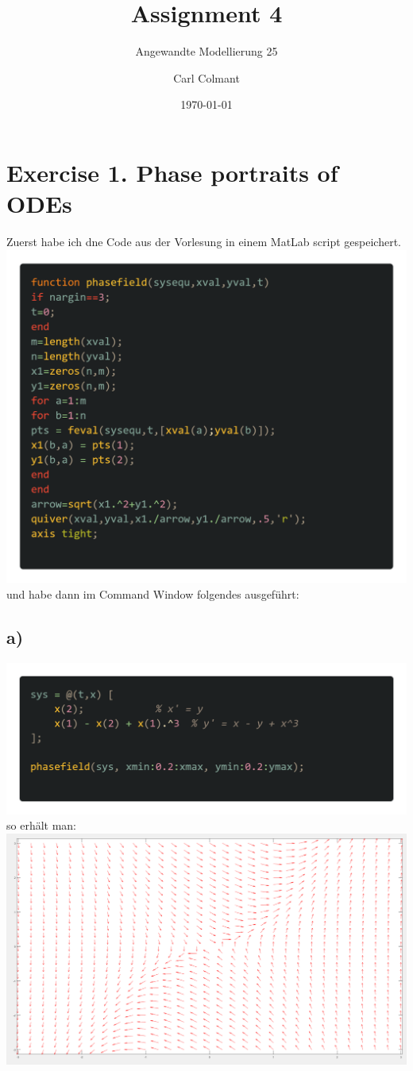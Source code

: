\documentclass{scrartcl}
\title{Assignment 4}
\subtitle{Angewandte Modellierung 25}
\author{Carl Colmant}
\date{\today}
\begin{document}
\maketitle
\newpage
\section*{Exercise 1. Phase portraits of ODEs}
Zuerst habe ich dne Code aus der Vorlesung in einem MatLab script gespeichert.\\
\includegraphics[scale=0.3]{PhasePortraitcode.png}\\
und habe dann im Command Window folgendes ausgeführt:
\subsection*{a)}
\includegraphics[scale=0.3]{aPhasefieldinit.png}\\
so erhält man:\\
\includegraphics[scale=0.2]{aPhasefieldout.png}
\end{document}
